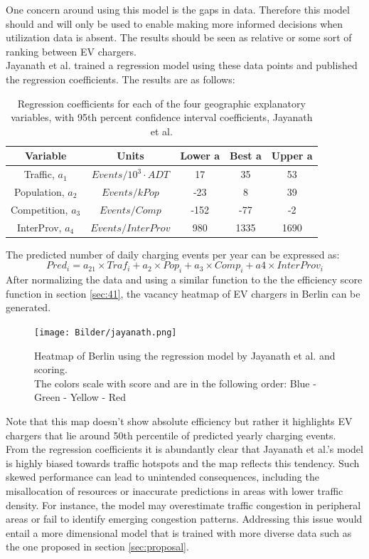 One concern around using this model is the gaps in data. Therefore this model should and will only be used to enable making more informed decisions when utilization data is absent. The results should be seen as relative or some sort of ranking between EV chargers.\\
Jayanath et al. trained a regression model using these data points and published the regression coefficients. The results are as follows:
\begin{table}[!h]
\begin{center}
\begin{tabular}{ | c | c | c | c | c | }
\hline
 Variable & Units & Lower a & Best a & Upper a \\ 
 \hline
 Traffic, $a_1$ & $Events/10^3\cdot ADT$ & 17 & 35 & 53 \\
 \hline
 Population, $a_2$ & $Events/kPop$ & -23 & 8 & 39 \\
 \hline
 Competition, $a_3$ & $Events/Comp$ & -152 & -77 & -2 \\
 \hline
 InterProv, $a_4$& $Events/InterProv$ & 980 & 1335 & 1690 \\
 \hline
\end{tabular}
\caption{ Regression coefficients for each of the four geographic explanatory variables, with 95th percent confidence interval coefficients, Jayanath et al.\cite{Jayanath2024} }
\end{center}
\end{table}

The predicted number of daily charging events per year can be expressed as:
\[
Pred_i = a_21 \times Traf_i + a_2 \times Pop_i + a_3 \times Comp_i + a4 \times InterProv_i
\]
After normalizing the data and using a similar function to the the efficiency score function in section \ref{sec:41}, the vacancy heatmap of EV chargers in Berlin can be generated. 
\begin{figure}[H]
\begin{center}
\texttt{[image: Bilder/jayanath.png]}
\caption{ Heatmap of Berlin using the regression model by Jayanath et al.\cite{Jayanath2024} and scoring.\\
          The colors scale with score and are in the following order: Blue - Green - Yellow - Red}
\end{center}
\end{figure}
Note that this map doesn't show absolute efficiency but rather it highlights EV chargers that lie around 50th percentile of predicted yearly charging events.\\
From the regression coefficients it is abundantly clear that Jayanath et al.'s model is highly biased towards traffic hotspots and the map reflects this tendency. Such skewed performance can lead to unintended consequences, including the misallocation of resources or inaccurate predictions in areas with lower traffic density. For instance, the model may overestimate traffic congestion in peripheral areas or fail to identify emerging congestion patterns. Addressing this issue would entail a more dimensional model that is trained with more diverse data such as the one proposed in section \ref{sec:proposal}.


